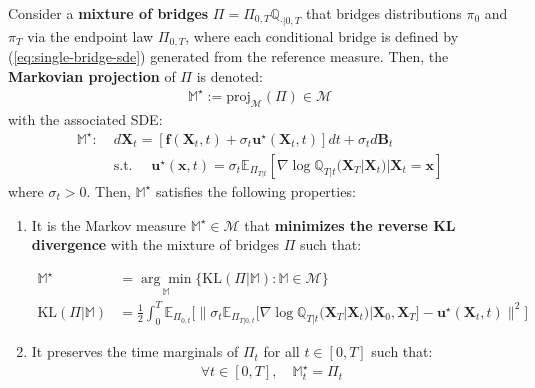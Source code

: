 \documentclass{article}
\begin{document}
\begin{proposition}\label{prop:markov-proj}
    Consider a \textbf{mixture of bridges} $\Pi=\Pi_{0,T}\mathbb{Q}_{\cdot|0,T}$ that bridges distributions $\pi_0$ and $\pi_T$ via the endpoint law $\Pi_{0,T}$, where each conditional bridge is defined by (\ref{eq:single-bridge-sde}) generated from the reference measure. Then, the \textbf{Markovian projection} of $\Pi$ is denoted:
    \begin{align}
        \mathbb{M}^\star:=\text{proj}_{\mathcal{M}}(\Pi)\in \mathcal{M}\tag{Markovian Projection}\label{eq:markovian-projection}
    \end{align}
    with the associated SDE:
    \begin{align}
        \mathbb{M}^\star: \;&d\boldsymbol{X}_t=\left[\boldsymbol{f}(\boldsymbol{X}_t,t)+\sigma_t\boldsymbol{u}^\star(\boldsymbol{X}_t,t)\right]dt+\sigma_td\boldsymbol{B}_t\tag{Markovian Projection SDE}\label{eq:markov-proj-sde}\\
        &\text{s.t. }\quad \boldsymbol{u}^\star(\boldsymbol{x},t)=\sigma_t\mathbb{E}_{\Pi_{T|t}}\left[\nabla \log \mathbb{Q}_{T|t}(\boldsymbol{X}_T|\boldsymbol{X}_t)|\boldsymbol{X}_t=\boldsymbol{x}\right]\tag{Markovian Projection Drift}\label{eq:markov-proj-optimal-drif}
    \end{align}
   where $\sigma_t> 0$.  Then, $\mathbb{M}^\star$ satisfies the following properties:
   \begin{enumerate}
       \item It is the Markov measure $\mathbb{M}^\star\in \mathcal{M}$ that \textbf{minimizes the reverse KL divergence} with the mixture of bridges $\Pi$ such that:
       \begin{small}
        \begin{align}
           \mathbb{M}^\star&=\underset{\mathbb{M}}{\arg\min}\{\text{KL}\left(\Pi|\mathbb{M}\right):\mathbb{M}\in \mathcal{M}\}\\
           \text{KL}\left(\Pi|\mathbb{M}\right)&=\frac{1}{2}\int_0^T\mathbb{E}_{\Pi_{0,t}}\bigg[\big\|\sigma_t\mathbb{E}_{\Pi_{T|0,t}}\big[\nabla  \log \mathbb{Q}_{T|t}(\boldsymbol{X}_T|\boldsymbol{X}_t)|\boldsymbol{X}_0, \boldsymbol{X}_T\big]-\boldsymbol{u}^\star(\boldsymbol{X}_t,t)\big\|^2\bigg]
       \end{align}
       \end{small}
       \item It preserves the time marginals of $\Pi_t$ for all $t\in [0,T]$ such that:
       \begin{align}
           \forall t\in [0,T], \quad \mathbb{M}^\star_t=\Pi_t
       \end{align}
   \end{enumerate}
\end{proposition}
\end{document}
